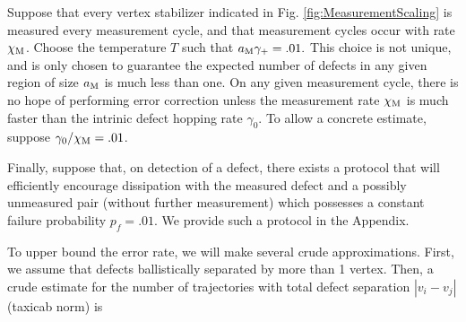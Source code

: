 \documentclass[twocolumn,superscriptaddress,aps,prb,floatfix]{revtex4-1}
\newcommand{\figref}[1]{Fig. \ref{#1}}
\begin{document}
 Suppose that every vertex stabilizer indicated in \figref{fig:MeasurementScaling} is measured every measurement cycle, and that measurement cycles occur with rate $\chi_{\rm{M}}$.  Choose the temperature $T$ such that $a_{\rm{M}} \gamma_+ = .01.$  This choice is not unique, and is only chosen to guarantee the expected number of defects in any given region of size $a_{\rm{M}}$ is much less than one.  On any given measurement cycle, there is no hope of performing error correction unless the measurement rate $\chi_{\rm{M}}$ is much faster than the intrinic defect hopping rate $\gamma_0$.  To allow a concrete estimate, suppose $\gamma_0/\chi_{\rm{M}}=.01$.
 
 Finally, suppose that, on detection of a defect, there exists a protocol that will efficiently encourage dissipation with the measured defect and a possibly unmeasured pair (without further measurement) which possesses a constant failure probability $p_f=.01$.  We provide such a protocol in the Appendix.
 
 To upper bound the error rate, we will make several crude approximations.  First, we assume that defects ballistically separated by more than 1 vertex.  Then, a crude estimate for the number of trajectories with total defect separation $|v_i - v_j|$ (taxicab norm) is 
 
 





\end{document}
